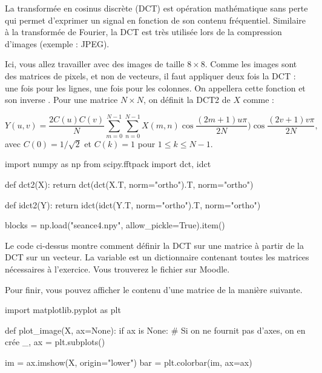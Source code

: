 \documentclass [a4paper, 11pt] {article}
\begin{document}
    \begin{exercice}{2}
    
        La transformée en cosinus discrète (DCT) est opération mathématique sans perte qui permet d'exprimer un signal en fonction de son contenu fréquentiel. Similaire à la transformée de Fourier, la DCT est très utilisée lors de la compression d'images (exemple : JPEG).
        
        Ici, vous allez travailler avec des images de taille $8 \times 8$. Comme les images sont des matrices de pixels, et non de vecteurs, il faut appliquer deux fois la DCT : une fois pour les lignes, une fois pour les colonnes. On appellera cette fonction  et son inverse . Pour une matrice $N\times N$, on définit la DCT2 de $X$ comme :
        
        \begin{equation}
            Y(u,v) = \frac{2 C(u) C(v)}{N} \sum\limits_{m=0}^{N-1}\sum\limits_{n=0}^{N-1} X(m,n) \cos\frac{(2m+1)u\pi}{2N})\cos\frac{(2v+1)v\pi}{2N},
        \end{equation}
        avec $C(0)=1/\sqrt{2}$ et $C(k) = 1$ pour $1 \le k \le N-1$.
    
        \begin{python}
import numpy as np
from scipy.fftpack import dct, idct

def dct2(X):
    return dct(dct(X.T, norm="ortho").T, norm="ortho")

def idct2(Y):
    return idct(idct(Y.T, norm="ortho").T, norm="ortho")

blocks = np.load("seance4.npy", allow_pickle=True).item()
        \end{python}
        
        Le code ci-dessus montre comment définir la DCT sur une matrice à partir de la DCT sur un vecteur. La variable  est un dictionnaire contenant toutes les matrices nécessaires à l'exercice. Vous trouverez le fichier  sur Moodle.
        
        Pour finir, vous pouvez afficher le contenu d'une matrice de la manière suivante.
        
        \begin{python}
import matplotlib.pyplot as plt

def plot_image(X, ax=None):
    if ax is None:  # Si on ne fournit pas d'axes, on en crée
        _, ax = plt.subplots()

    im = ax.imshow(X, origin="lower")
    bar = plt.colorbar(im, ax=ax)


\end{python}
\end{exercice}
\end{document}

